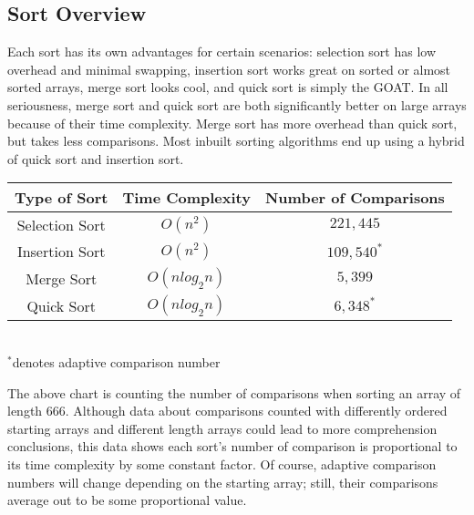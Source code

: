\documentclass[letterpaper, 10pt]{article}
\begin{document}
\subsection{Sort Overview}
Each sort has its own advantages for certain scenarios: selection sort has low overhead and minimal
swapping, insertion sort works great on sorted or almost sorted arrays, merge sort looks cool, and 
quick sort is simply the GOAT. In all seriousness, merge sort and quick sort are both significantly better on large arrays
because of their time complexity. Merge sort has more overhead than quick sort, but takes less comparisons. 
Most inbuilt sorting algorithms end up using a hybrid of quick sort and insertion sort.
\begin{center}
\begin{tabular}{||c c c||} 
 \hline
 Type of Sort & Time Complexity & Number of Comparisons \\ [0.5ex] 
 \hline\hline
 Selection Sort & \( O(n^2)\) & \(221,445\) \\
 \hline
 Insertion Sort & \( O(n^2)\) & \(109,540^*\) \\
 \hline
 Merge Sort & \( O(nlog_2n)\) & \(5,399\) \\
 \hline
 Quick Sort & \( O(nlog_2n)\) & \(6,348^*\) \\
 \hline
\end{tabular}
\\
\(^*\)denotes adaptive comparison number
\end{center}
The above chart is counting the number of comparisons when sorting an array of
length 666. Although data about comparisons counted with differently ordered starting arrays
and different length arrays could lead to more comprehension conclusions, this data shows
each sort's number of comparison is proportional to its time complexity by some constant factor.
Of course, adaptive comparison numbers will change depending on the starting array; still,
their comparisons average out to be some proportional value.
\end{document}
